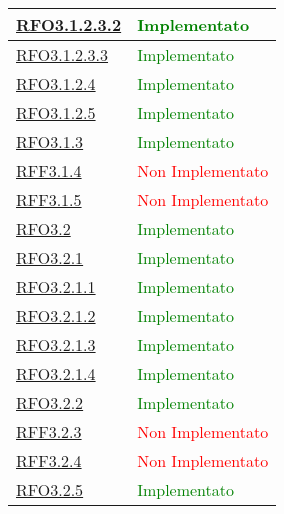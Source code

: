 \begin{longtable}{|>{\centering}m{5cm}|m{5cm}<{\centering}|}
\hyperlink{RFO3.1.2.3.2}{RFO3.1.2.3.2} &  \textcolor{green}{Implementato}\\ \hline

\hyperlink{RFO3.1.2.3.3}{RFO3.1.2.3.3} &  \textcolor{green}{Implementato}\\ \hline

\hyperlink{RFO3.1.2.4}{RFO3.1.2.4} &  \textcolor{green}{Implementato}\\ \hline

\hyperlink{RFO3.1.2.5}{RFO3.1.2.5} &  \textcolor{green}{Implementato}\\ \hline

\hyperlink{RFO3.1.3}{RFO3.1.3} &  \textcolor{green}{Implementato}\\ \hline

\hyperlink{RFF3.1.4}{RFF3.1.4} &  \textcolor{red}{Non Implementato}\\ \hline

\hyperlink{RFF3.1.5}{RFF3.1.5} &  \textcolor{red}{Non Implementato}\\ \hline

\hyperlink{RFO3.2}{RFO3.2} &  \textcolor{green}{Implementato}\\ \hline

\hyperlink{RFO3.2.1}{RFO3.2.1} &  \textcolor{green}{Implementato}\\ \hline

\hyperlink{RFO3.2.1.1}{RFO3.2.1.1} & \textcolor{green}{Implementato}\\ \hline

\hyperlink{RFO3.2.1.2}{RFO3.2.1.2} &  \textcolor{green}{Implementato}\\ \hline

\hyperlink{RFO3.2.1.3}{RFO3.2.1.3} & \textcolor{green}{Implementato}\\ \hline

\hyperlink{RFO3.2.1.4}{RFO3.2.1.4} &  \textcolor{green}{Implementato}\\ \hline

\hyperlink{RFO3.2.2}{RFO3.2.2} & \textcolor{green}{Implementato}\\ \hline

\hyperlink{RFF3.2.3}{RFF3.2.3} &  \textcolor{red}{Non Implementato}\\ \hline

\hyperlink{RFF3.2.4}{RFF3.2.4} &  \textcolor{red}{Non Implementato}\\ \hline

\hyperlink{RFO3.2.5}{RFO3.2.5} &  \textcolor{green}{Implementato}\\ \hline


\end{longtable}
